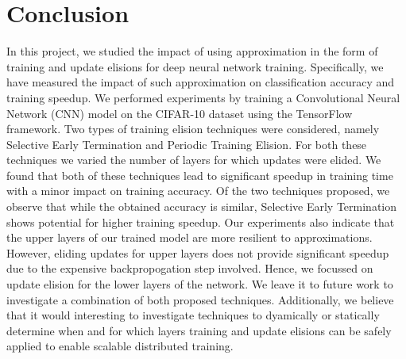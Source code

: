 \section{Conclusion}
In this project, we studied the impact of using approximation in the form of training and update elisions for deep neural network training. Specifically, we have measured the impact of such approximation on classification accuracy and training speedup. We performed experiments by training a Convolutional Neural Network (CNN) model on the CIFAR-10 dataset using the TensorFlow framework. Two types of training elision techniques were considered, namely Selective Early Termination and Periodic Training Elision. For both these techniques we varied the number of layers for which updates were elided. We found that both of these techniques lead to significant speedup in training time with a minor impact on training accuracy.  Of the two techniques proposed, we observe that while the obtained accuracy is similar, Selective Early Termination shows potential for higher training speedup. Our experiments also indicate that the upper layers of our trained model are more resilient to approximations. However, eliding updates for upper layers does not provide significant speedup due to the expensive backpropogation step involved. Hence, we focussed on update elision for the lower layers of the network.
We leave it to future work to investigate a combination of both proposed techniques. Additionally, we believe that it would interesting to investigate techniques to dyamically or statically determine when and for which layers training and update elisions can be safely applied to enable scalable distributed training.  
